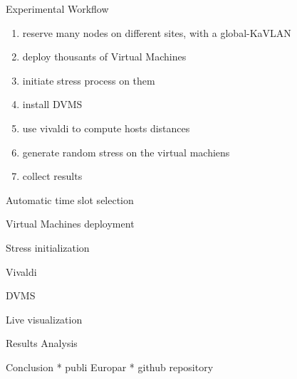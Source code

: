 \documentclass{beamer}
\begin{document}
\begin{frame}{Experimental Workflow}
\begin{enumerate}
\item reserve many nodes on different sites, with a global-KaVLAN
\item deploy thousants of Virtual Machines
\item initiate stress process on them
\item install DVMS
\item use vivaldi to compute hosts distances
\item generate random stress on the virtual machiens
\item collect results
\end{enumerate}
\end{frame}

\begin{frame}{Automatic time slot selection}
\end{frame}

\begin{frame}{Virtual Machines deployment}
\end{frame}

\begin{frame}{Stress initialization}
\end{frame}

\begin{frame}{Vivaldi}
\end{frame}

\begin{frame}{DVMS}
\end{frame}

\begin{frame}{Live visualization}
\end{frame}

\begin{frame}{Results Analysis}
\end{frame}

\begin{frame}{Conclusion}
* publi Europar
* github repository
\end{frame}
\end{document}
